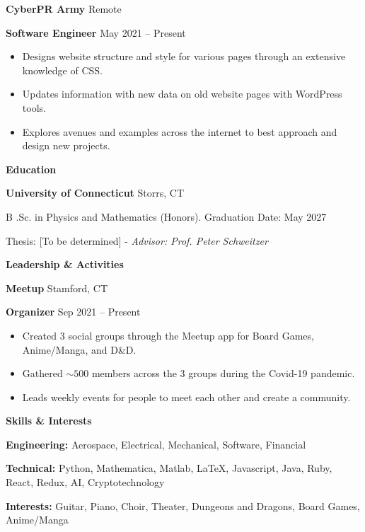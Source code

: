 \documentclass[11pt]{article}
\begin{document}
\vspace{12pt}

\textbf{CyberPR Army} \hfill Remote

\textbf{Software Engineer} \hfill May 2021 – Present
\begin{itemize}[noitemsep, topsep=0pt, partopsep=0pt, parsep=0pt]
    \item Designs website structure and style for various pages through an extensive knowledge of CSS.
    \item Updates information with new data on old website pages with WordPress tools.
    \item Explores avenues and examples across the internet to best approach and design new projects.
\end{itemize}

\vspace{12pt}

\begin{center}
    \textbf{Education}
\end{center}
\textbf{University of Connecticut} \hfill Storrs, CT

B .Sc. in Physics and Mathematics (Honors). \hfill Graduation Date: May 2027

Thesis: [To be determined] - \textit{Advisor: Prof. Peter Schweitzer}

\vspace{12pt}

\begin{center}
    \textbf{Leadership \& Activities}
\end{center}

\textbf{Meetup}	\hfill Stamford, CT

\textbf{Organizer} \hfill Sep 2021 – Present
\begin{itemize}[noitemsep, topsep=0pt, partopsep=0pt, parsep=0pt]
    \item Created 3 social groups through the Meetup app for Board Games, Anime/Manga, and D\&D.
    \item Gathered $\sim 500$ members across the 3 groups during the Covid-19 pandemic.
    \item Leads weekly events for people to meet each other and create a community.
\end{itemize}

\begin{center}
    \textbf{Skills \& Interests}
\end{center}

\textbf{Engineering:} Aerospace, Electrical, Mechanical, Software, Financial

\textbf{Technical:} Python, Mathematica, Matlab, LaTeX, Javascript, Java, Ruby, React, Redux, AI, Cryptotechnology

\textbf{Interests:} Guitar, Piano, Choir, Theater, Dungeons and Dragons, Board Games, Anime/Manga
\end{document}
